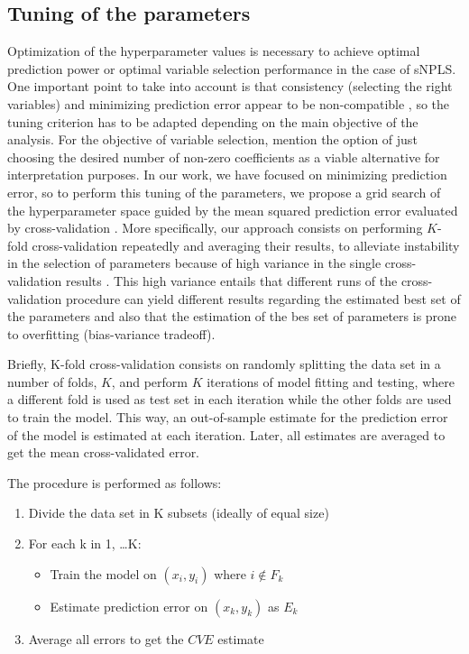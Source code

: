 \subsection{Tuning of the parameters}
Optimization of the hyperparameter values is necessary to achieve optimal prediction power or optimal variable selection performance in the case of sNPLS. One important point to take into account is that consistency (selecting the right variables) and minimizing prediction error appear to be non-compatible \parencite{yang2005can}, so the tuning criterion has to be adapted depending on the main objective of the analysis. For the objective of variable selection, \textcite{zou2005regularization} mention the option of just choosing the desired number of non-zero coefficients as a viable alternative for interpretation purposes. In our work, we have focused on minimizing prediction error, so to perform this tuning of the parameters, we propose a grid search of the hyperparameter space \parencite{lameski2015svm} guided by the mean squared prediction error evaluated by cross-validation \parencite{duarte2017empirical}. More specifically, our approach consists on performing $K$-fold cross-validation repeatedly and averaging their results, to alleviate instability in the selection of parameters because of high variance in the single cross-validation results \parencite{krstajic2014cross}. This high variance entails that different runs of the cross-validation procedure can yield different results regarding the estimated best set of the parameters and also that the estimation of the bes set of parameters is prone to overfitting (bias-variance tradeoff).

Briefly, K-fold cross-validation consists on randomly splitting the data set in a number of folds, $K$, and perform $K$ iterations of model fitting and testing, where a different fold is used as test set in each iteration while the other folds are used to train the model. This way, an out-of-sample estimate for the prediction error of the model is estimated at each iteration. Later, all estimates are averaged to get the mean cross-validated error. 

The procedure is performed as follows:
\vspace{20pt}
\begin{enumerate}
    \item Divide the data set in K subsets (ideally of equal size)
    \item For each k in 1, \dots K:
    \begin{itemize}
        \item Train the model on $(x_i, y_i)$ where $i \notin F_k$
        \item Estimate prediction error on $(x_k, y_k)$ as $E_k$
    \end{itemize}
    \item Average all errors to get the $CVE$ estimate
\end{enumerate}


